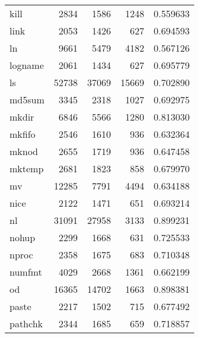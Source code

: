 \begin{tabular}{lrrrr}
kill      &                     2834 &         1586 &          1248 &                 0.559633 \\
link      &                     2053 &         1426 &           627 &                 0.694593 \\
ln        &                     9661 &         5479 &          4182 &                 0.567126 \\
logname   &                     2061 &         1434 &           627 &                 0.695779 \\
ls        &                    52738 &        37069 &         15669 &                 0.702890 \\
md5sum    &                     3345 &         2318 &          1027 &                 0.692975 \\
mkdir     &                     6846 &         5566 &          1280 &                 0.813030 \\
mkfifo    &                     2546 &         1610 &           936 &                 0.632364 \\
mknod     &                     2655 &         1719 &           936 &                 0.647458 \\
mktemp    &                     2681 &         1823 &           858 &                 0.679970 \\
mv        &                    12285 &         7791 &          4494 &                 0.634188 \\
nice      &                     2122 &         1471 &           651 &                 0.693214 \\
nl        &                    31091 &        27958 &          3133 &                 0.899231 \\
nohup     &                     2299 &         1668 &           631 &                 0.725533 \\
nproc     &                     2358 &         1675 &           683 &                 0.710348 \\
numfmt    &                     4029 &         2668 &          1361 &                 0.662199 \\
od        &                    16365 &        14702 &          1663 &                 0.898381 \\
paste     &                     2217 &         1502 &           715 &                 0.677492 \\
pathchk   &                     2344 &         1685 &           659 &                 0.718857 \\

\end{tabular}
